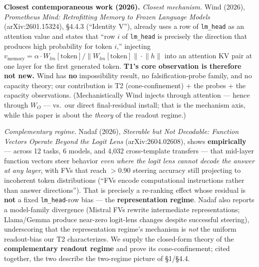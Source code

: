 \documentclass[11pt]{article}
\theoremstyle{plain}
\theoremstyle{definition}
\begin{document}
\textbf{Closest contemporaneous work (2026).} \emph{Closest mechanism.} Wind (2026), \emph{Prometheus Mind: Retrofitting Memory to Frozen Language Models} (arXiv:2601.15324), \S4.4.3 (``Identity V''), already uses a row of \texttt{lm\_head} as an attention value and states that ``row $i$ of \texttt{lm\_head} is precisely the direction that produces high probability for token $i$,'' injecting $v_{\mathrm{memory}} = \alpha\cdot W_{lm}[\mathrm{token}]/\lVert W_{lm}[\mathrm{token}]\rVert\cdot\lVert h\rVert$ into an attention KV pair at one layer for the first generated token. \textbf{T1's core observation is therefore not new.} Wind has \textbf{no} impossibility result, no falsification-probe family, and no capacity theory; our contribution is T2 (cone-confinement) + the probes + the capacity observations. (Mechanistically Wind injects through attention --- hence through $W_O$ --- vs.\ our direct final-residual install; that is the mechanism axis, while this paper is about the \emph{theory} of the readout regime.)

\emph{Complementary regime.} Nadaf (2026), \emph{Steerable but Not Decodable: Function Vectors Operate Beyond the Logit Lens} (arXiv:2604.02608), shows \textbf{empirically} --- across 12 tasks, 6 models, and 4{,}032 cross-template transfers --- that mid-layer function vectors steer behavior \emph{even where the logit lens cannot decode the answer at any layer}, with FVs that reach $>0.90$ steering accuracy still projecting to incoherent token distributions (``FVs encode computational instructions rather than answer directions''). That is precisely a re-ranking effect whose residual is \textbf{not} a fixed \texttt{lm\_head}-row bias --- the \textbf{representation regime}. Nadaf also reports a model-family divergence (Mistral FVs rewrite intermediate representations; Llama/Gemma produce near-zero logit-lens changes despite successful steering), underscoring that the representation regime's mechanism is \emph{not} the uniform readout-bias our T2 characterizes. We supply the closed-form theory of the \textbf{complementary readout regime} and prove its cone-confinement; cited together, the two describe the two-regime picture of \S1/\S4.4.
\end{document}
